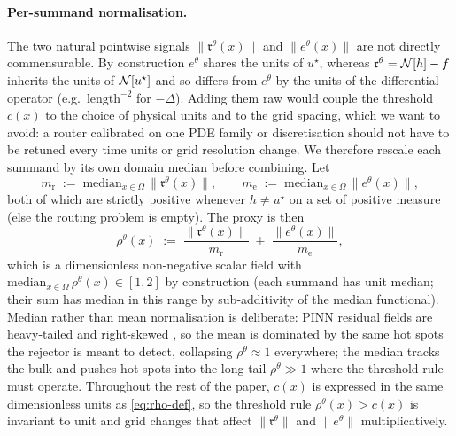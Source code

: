 \paragraph{Per-summand normalisation.}
The two natural pointwise signals $\|\mathfrak{r}^\theta(x)\|$ and
$\|e^\theta(x)\|$ are not directly commensurable. By construction
$e^\theta$ shares the units of $u^\star$, whereas $\mathfrak{r}^\theta=
\mathcal{N}[h]-f$ inherits the units of $\mathcal{N}[u^\star]$ and so differs from
$e^\theta$ by the units of the differential operator (e.g.\
$\mathrm{length}^{-2}$ for $-\Delta$). Adding them raw would couple the
threshold $c(x)$ to the choice of physical units and to the grid
spacing, which we want to avoid: a router calibrated on one PDE family or
discretisation should not have to be retuned every time units or grid
resolution change. We therefore rescale each summand by its own domain
median before combining. Let
\begin{equation}
  m_{\mathrm{r}}\;:=\;\mathrm{median}_{x\in\Omega}\,\bigl\|\mathfrak{r}^\theta(x)\bigr\|,
  \qquad
  m_{\mathrm{e}}\;:=\;\mathrm{median}_{x\in\Omega}\,\bigl\|e^\theta(x)\bigr\|,
  \label{eq:medians}
\end{equation}
both of which are strictly positive whenever $h\neq u^\star$ on a set of
positive measure (else the routing problem is empty). The proxy is then
\begin{equation}
  \rho^\theta(x)\;:=\;
  \frac{\bigl\|\mathfrak{r}^\theta(x)\bigr\|}{m_{\mathrm{r}}}
  \;+\;
  \frac{\bigl\|e^\theta(x)\bigr\|}{m_{\mathrm{e}}},
  \label{eq:rho-def}
\end{equation}
which is a dimensionless non-negative scalar field with
$\mathrm{median}_{x\in\Omega}\,\rho^\theta(x)\in[1,2]$ by construction
(each summand has unit median; their sum has median in this range by
sub-additivity of the median functional). Median rather than mean
normalisation is deliberate: PINN residual fields are heavy-tailed and
right-skewed \citep{wang2021understanding,wang2022whenpinns}, so the mean
is dominated by the same hot spots the rejector is meant to detect,
collapsing $\rho^\theta\approx 1$ everywhere; the median tracks the bulk
and pushes hot spots into the long tail $\rho^\theta\gg 1$ where the
threshold rule must operate. Throughout the rest of the paper, $c(x)$ is
expressed in the same dimensionless units as \eqref{eq:rho-def}, so the
threshold rule $\rho^\theta(x)>c(x)$ is invariant to unit and grid
changes that affect $\|\mathfrak{r}^\theta\|$ and $\|e^\theta\|$
multiplicatively.


